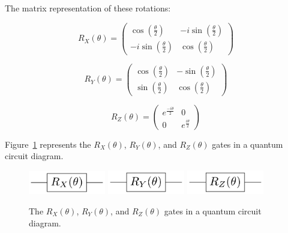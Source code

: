 The matrix representation of these rotations:

\begin{linenomath}
\begin{equation}
	R_X(\theta)=\begin{pmatrix}
\cos(\frac{\theta}{2}) & -i\sin(\frac{\theta}{2}) \\
-i\sin(\frac{\theta}{2}) & \cos(\frac{\theta}{2})
\end{pmatrix} 
\label{eq:rotx}
\end{equation}
\end{linenomath}
\begin{linenomath}
\begin{equation}
	R_Y(\theta)=\begin{pmatrix}
\cos(\frac{\theta}{2}) & -\sin(\frac{\theta}{2}) \\
\sin(\frac{\theta}{2}) & \cos(\frac{\theta}{2})
\end{pmatrix}
\label{eq:roty}
\end{equation}
\end{linenomath}
\begin{linenomath}
\begin{equation}
	R_Z(\theta)=\begin{pmatrix}
e^{\frac{-i\theta}{2}} & 0 \\
0 & e^{\frac{i\theta}{2}}
\end{pmatrix}
\label{eq:rotz}
\end{equation}
\end{linenomath}

Figure~\ref{fig:rotscirc} represents the $R_X(\theta)$, $R_Y(\theta)$, 
and $R_Z(\theta)$ gates in a quantum circuit diagram.

\begin{figure}[!htbp]
\centering
	\includegraphics[width=0.30\textwidth]{figures/RX.pdf}
	\includegraphics[width=0.30\textwidth]{figures/RY.pdf}
	\includegraphics[width=0.30\textwidth]{figures/RZ.pdf}
\caption{The $R_X(\theta)$, $R_Y(\theta)$, and $R_Z(\theta)$ gates in a quantum 
circuit diagram.}
\label{fig:rotscirc}
\end{figure}

